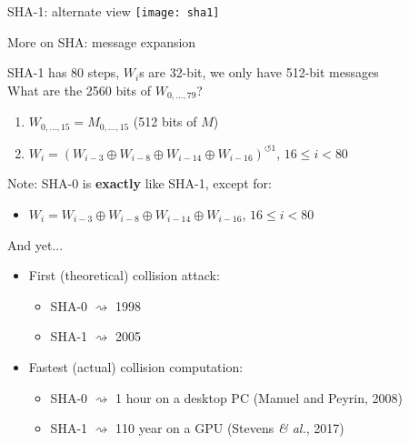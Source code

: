 \documentclass[xcolor=table,usenames,dvipsnames,compress]{beamer}
\newcommand\etal{\emph{\& al.}\xspace}
\begin{document}
\begin{frame}{SHA-1: alternate view}
\centering
\texttt{[image: sha1]}
\end{frame}

\begin{frame}{More on SHA: message expansion}
\vspace{-4mm}

SHA-1 has 80 steps, $W_i$s are 32-bit, we only have 512-bit messages\\
What are the 2560 bits of $W_{0,\ldots,79}$?
\begin{enumerate}
\item $W_{0,\ldots,15} = M_{0,\ldots,15}$ (512 bits of $M$) 
\item $W_i = (W_{i-3} \oplus W_{i-8} \oplus W_{i-14} \oplus W_{i-16})^{\circlearrowleft 1}$, $16 \leq i < 80$
\end{enumerate}

\smallskip

Note: SHA-0 is \textbf{exactly} like SHA-1, except for:
\begin{itemize}
\item $W_i = W_{i-3} \oplus W_{i-8} \oplus W_{i-14} \oplus W_{i-16}$, $16 \leq i < 80$
\end{itemize}

And yet...
\begin{itemize}
\item First (theoretical) collision attack:
\begin{itemize}
\item SHA-0 $\rightsquigarrow$ 1998
\item SHA-1 $\rightsquigarrow$ 2005
\end{itemize}
\item Fastest (actual) collision computation:
\begin{itemize}
\item SHA-0 $\rightsquigarrow$ 1 hour on a desktop PC (Manuel and Peyrin, 2008)
\item SHA-1 $\rightsquigarrow$ 110 year on a GPU (Stevens \etal, 2017)
\end{itemize}
\end{itemize}
\end{frame}
\end{document}
